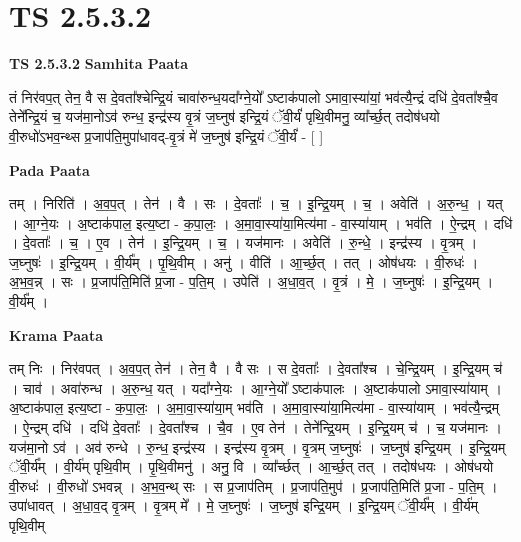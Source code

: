 \documentclass[17pt]{extarticle}
\begin{document}
\section{ TS 2.5.3.2 }

\textbf{TS 2.5.3.2 } \newline
\textbf{Samhita Paata} \newline

तं निर॑वप॒त् तेन॒ वै स दे॒वता᳚श्चेन्द्रि॒यं चावा॑रुन्ध॒यदा᳚ग्ने॒यो᳚ ऽष्टाक॑पालो ऽमावा॒स्या॑यां॒ भव॑त्यै॒न्द्रं दधि॑ दे॒वता᳚श्चै॒व तेने᳚न्द्रि॒यं च॒ यज॑मा॒नोऽव॑ रुन्ध॒ इन्द्र॑स्य वृ॒त्रं ज॒घ्नुष॑ इन्द्रि॒यं ॅवी॒र्यं॑ पृथि॒वीमनु॒ व्या᳚र्च्छ॒त् तदोष॑धयो वी॒रुधो॑ऽभव॒न्थ्स प्र॒जाप॑ति॒मुपा॑धावद्-वृ॒त्रं मे॑ ज॒घ्नुष॑ इन्द्रि॒यं ॅवी॒र्यं॑ - [  ] \newline

\textbf{Pada Paata} \newline

तम् । निरिति॑ । अ॒व॒प॒त् । तेन॑ । वै । सः । दे॒वताः᳚ । च॒ । इ॒न्द्रि॒यम् । च॒ । अवेति॑ । अ॒रु॒न्ध॒ । यत् । आ॒ग्ने॒यः । अ॒ष्टाक॑पाल॒ इत्य॒ष्टा - क॒पा॒लः॒ । अ॒मा॒वा॒स्या॑या॒मित्य॑मा - वा॒स्या॑याम् । भव॑ति । ऐ॒न्द्रम् । दधि॑ । दे॒वताः᳚ । च॒ । ए॒व । तेन॑ । इ॒न्द्रि॒यम् । च॒ । यज॑मानः । अवेति॑ । रु॒न्धे॒ । इन्द्र॑स्य । वृ॒त्रम् । ज॒घ्नुषः॑ । इ॒न्द्रि॒यम् । वी॒र्य᳚म् । पृ॒थि॒वीम् । अनु॑ । वीति॑ । आ॒र्च्छ॒त् । तत् । ओष॑धयः । वी॒रुधः॑ । अ॒भ॒व॒न्न् । सः । प्र॒जाप॑ति॒मिति॑ प्र॒जा - प॒ति॒म् । उपेति॑ । अ॒धा॒व॒त् । वृ॒त्रं । मे॒ । ज॒घ्नुषः॑ । इ॒न्द्रि॒यम् । वी॒र्य᳚म् ।  \newline


\textbf{Krama Paata} \newline

तम् निः । निर॑वपत् । अ॒व॒प॒त् तेन॑ । तेन॒ वै । वै सः । स दे॒वताः᳚ । दे॒वता᳚श्च । चे॒न्द्रि॒यम् । इ॒न्द्रि॒यम् च॑ । चाव॑ । अवा॑रुन्ध । अ॒रु॒न्ध॒ यत् । यदा᳚ग्ने॒यः । आ॒ग्ने॒यो᳚ ऽष्टाक॑पालः । अ॒ष्टाक॑पालो ऽमावा॒स्या॑याम् । अ॒ष्टाक॑पाल॒ इत्य॒ष्टा - क॒पा॒लः॒ । अ॒मा॒वा॒स्या॑या॒म् भव॑ति । अ॒मा॒वा॒स्या॑या॒मित्य॑मा - वा॒स्या॑याम् । भव॑त्यै॒न्द्रम् । ऐ॒न्द्रम् दधि॑ । दधि॑ दे॒वताः᳚ । दे॒वता᳚श्च । चै॒व । ए॒व तेन॑ । तेने᳚न्द्रि॒यम् । इ॒न्द्रि॒यम् च॑ । च॒ यज॑मानः । यज॑मा॒नो ऽव॑ । अव॑ रुन्धे । रु॒न्ध॒ इन्द्र॑स्य । इन्द्र॑स्य वृ॒त्रम् । वृ॒त्रम् ज॒घ्नुषः॑ । ज॒घ्नुष॑ इन्द्रि॒यम् । इ॒न्द्रि॒यम् ॅवी॒र्य᳚म् । वी॒र्य॑म् पृथि॒वीम् । पृ॒थि॒वीमनु॑ । अनु॒ वि । व्या᳚र्च्छत् । आ॒र्च्छ॒त् तत् । तदोष॑धयः । ओष॑धयो वी॒रुधः॑ । वी॒रुधो॑ ऽभवन्न् । अ॒भ॒व॒न्थ् सः । स प्र॒जाप॑तिम् । प्र॒जाप॑ति॒मुप॑ । प्र॒जाप॑ति॒मिति॑ प्र॒जा - प॒ति॒म् । उपा॑धावत् । अ॒धा॒व॒द् वृ॒त्रम् । वृ॒त्रम् मे᳚ । मे॒ ज॒घ्नुषः॑ । ज॒घ्नुष॑ इन्द्रि॒यम् । इ॒न्द्रि॒यम् ॅवी॒र्य᳚म् । वी॒र्य॑म् पृथि॒वीम् \newline
\end{document}

